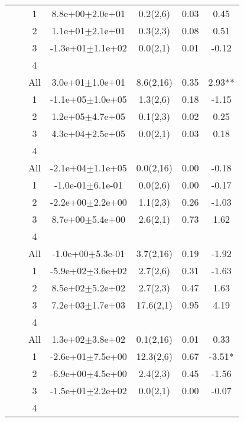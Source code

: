 \begin{longtable}{llccccS[table-format=-2.2, table-space-text-post = {***}]}
{} & {} & 1 &  8.8e+00$\pm$2.0e+01 & 0.2(2,6) & 0.03 & 0.45 \\ 
   &  & 2 &  1.1e+01$\pm$2.1e+01 & 0.3(2,3) & 0.08 & 0.51 \\ 
   &  & 3 & -1.3e+01$\pm$1.1e+02 & 0.0(2,1) & 0.01 & -0.12 \\ 
   &  & 4 &  &  &  &  \\ 
   &  & All &  3.0e+01$\pm$1.0e+01 & 8.6(2,16) & 0.35 & 2.93** \\ 
   \midrule
{} & {} & 1 & -1.1e+05$\pm$1.0e+05 & 1.3(2,6) & 0.18 & -1.15 \\ 
   &  & 2 &  1.2e+05$\pm$4.7e+05 & 0.1(2,3) & 0.02 & 0.25 \\ 
   &  & 3 &  4.3e+04$\pm$2.5e+05 & 0.0(2,1) & 0.03 & 0.18 \\ 
   &  & 4 &  &  &  &  \\ 
   &  & All & -2.1e+04$\pm$1.1e+05 & 0.0(2,16) & 0.00 & -0.18 \\ 
   \midrule
{} & {} & 1 & -1.0e-01$\pm$6.1e-01 & 0.0(2,6) & 0.00 & -0.17 \\ 
   &  & 2 & -2.2e+00$\pm$2.2e+00 & 1.1(2,3) & 0.26 & -1.03 \\ 
   &  & 3 &  8.7e+00$\pm$5.4e+00 & 2.6(2,1) & 0.73 & 1.62 \\ 
   &  & 4 &  &  &  &  \\ 
   &  & All & -1.0e+00$\pm$5.3e-01 & 3.7(2,16) & 0.19 & -1.92 \\ 
   \midrule
{} & {} & 1 & -5.9e+02$\pm$3.6e+02 & 2.7(2,6) & 0.31 & -1.63 \\ 
   &  & 2 &  8.5e+02$\pm$5.2e+02 & 2.7(2,3) & 0.47 & 1.63 \\ 
   &  & 3 &  7.2e+03$\pm$1.7e+03 & 17.6(2,1) & 0.95 & 4.19 \\ 
   &  & 4 &  &  &  &  \\ 
   &  & All &  1.3e+02$\pm$3.8e+02 & 0.1(2,16) & 0.01 & 0.33 \\ 
   \midrule
{} & {} & 1 & -2.6e+01$\pm$7.5e+00 & 12.3(2,6) & 0.67 & -3.51* \\ 
   &  & 2 & -6.9e+00$\pm$4.5e+00 & 2.4(2,3) & 0.45 & -1.56 \\ 
   &  & 3 & -1.5e+01$\pm$2.2e+02 & 0.0(2,1) & 0.00 & -0.07 \\ 
   &  & 4 &  &  &  &  \\ 

\end{longtable}
